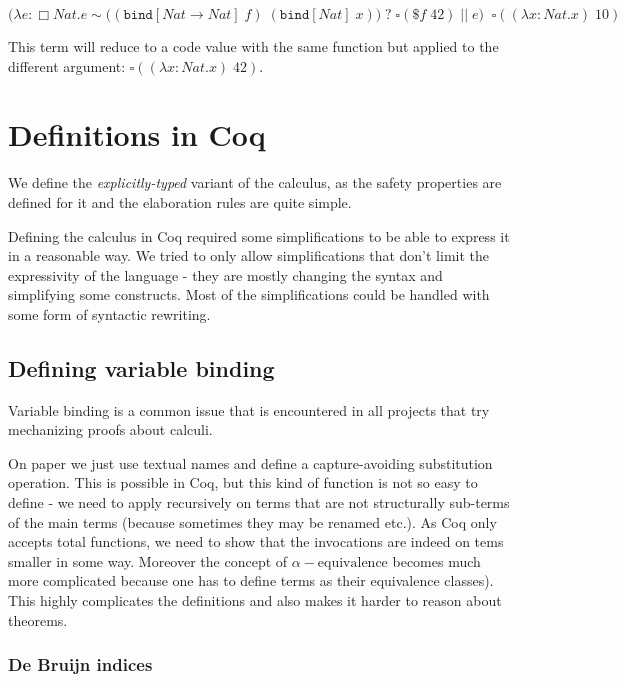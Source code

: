 \documentclass[runningheads]{article}
\newcommand{\qtype}[1]{\Box#1}
\newcommand{\lam}[3]{\lambda#1{:}#2.#3}
\begin{document}
\begin{equation*}
  \Big(\lam{e}{\qtype{Nat}}{e \sim \big((\texttt{bind} [Nat \to Nat] \; f) \; (\texttt{bind} [Nat] \; x)\big) \; ? \; \square(\$f \; 42) \; || \; e} \Big) \;\; \square((\lam{x}{Nat}{x}) \; 10)
\end{equation*}

This term will reduce to a code value with the same function but applied to the different argument: $\square((\lam{x}{Nat}{x}) \; 42)$.

\section{Definitions in Coq}
\label{sec:definitions}
We define the \textit{explicitly-typed} variant of the calculus, as the safety properties are defined for it and the elaboration rules are quite simple.

Defining the calculus in Coq required some simplifications to be able to express it in a reasonable way. We tried to only allow simplifications that don't limit the expressivity of the language - they are mostly changing the syntax and simplifying some constructs. Most of the simplifications could be handled with some form of syntactic rewriting.

\subsection{Defining variable binding}

Variable binding is a common issue that is encountered in all projects that try mechanizing proofs about calculi. 

On paper we just use textual names and define a capture-avoiding substitution operation. This is possible in Coq, but this kind of function is not so easy to define - we need to apply recursively on terms that are not structurally sub-terms of the main terms (because sometimes they may be renamed etc.). As Coq only accepts total functions, we need to show that the invocations are indeed on tems smaller in some way. Moreover the concept of $\alpha-\text{equivalence}$ becomes much more complicated because one has to define terms as their equivalence classes). This highly complicates the definitions and also makes it harder to reason about theorems.

\subsubsection{De Bruijn indices}
\end{document}
